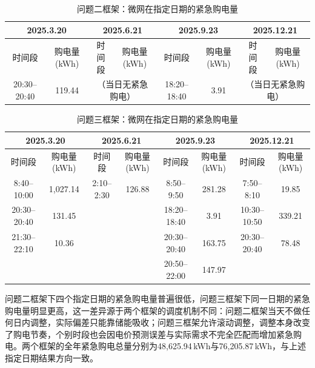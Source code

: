 \begin{table}[H]
  \centering
  \caption{问题二框架：微网在指定日期的紧急购电量}
  \label{tab:q4-2-specific-emergency}
  \tiny
  \renewcommand{\arraystretch}{1.2}
  \begin{tabular}{|c|c|c|c|c|c|c|c|}
    \hline
    \multicolumn{2}{|c|}{2025.3.20} & \multicolumn{2}{c|}{2025.6.21} & \multicolumn{2}{c|}{2025.9.23} & \multicolumn{2}{c|}{2025.12.21} \\
    \hline
    时间段 & 购电量(kWh) & 时间段 & 购电量(kWh) & 时间段 & 购电量(kWh) & 时间段 & 购电量(kWh) \\
    \hline
    20:30--20:40 & 119.44 & \multicolumn{2}{c|}{（当日无紧急购电）} & 18:20--18:40 & 3.91 & \multicolumn{2}{c|}{（当日无紧急购电）} \\
    \hline
  \end{tabular}
\end{table}

\begin{table}[H]
  \centering
  \caption{问题三框架：微网在指定日期的紧急购电量}
  \label{tab:q4-3-specific-emergency}
  \tiny
  \renewcommand{\arraystretch}{1.2}
  \begin{tabular}{|c|c|c|c|c|c|c|c|}
    \hline
    \multicolumn{2}{|c|}{2025.3.20} & \multicolumn{2}{c|}{2025.6.21} & \multicolumn{2}{c|}{2025.9.23} & \multicolumn{2}{c|}{2025.12.21} \\
    \hline
    时间段 & 购电量(kWh) & 时间段 & 购电量(kWh) & 时间段 & 购电量(kWh) & 时间段 & 购电量(kWh) \\
    \hline
    8:40--10:00 & 1{,}027.14 & 2:10--2:30 & 126.88 & 8:50--9:50 & 281.28 & 7:50--8:10 & 19.85 \\
    \hline
    20:30--20:40 & 131.45 & & & 18:20--18:40 & 3.91 & 10:30--10:50 & 339.21 \\
    \hline
    21:30--22:10 & 10.36 & & & 20:30--20:40 & 163.75 & 20:30--20:40 & 78.48 \\
    \hline
    & & & & 20:50--22:00 & 147.97 & & \\
    \hline
  \end{tabular}
\end{table}

问题二框架下四个指定日期的紧急购电量普遍很低，问题三框架下同一日期的紧急购电量明显更高，这一差异源于两个框架的调度机制不同：问题二框架当天不做任何日内调整，实际偏差只能靠储能吸收；问题三框架允许滚动调整，调整本身改变了购电节奏，个别时段也会因电价预测误差与实际需求不完全匹配而增加紧急购电。两个框架的全年紧急购电总量分别为48{,}625.94\,kWh与76{,}205.87\,kWh，与上述指定日期结果方向一致。

